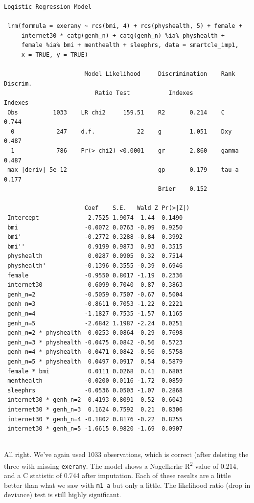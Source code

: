 \documentclass[]{book}
\theoremstyle{definition}
\theoremstyle{definition}
\theoremstyle{definition}
\theoremstyle{remark}
\begin{document}
\begin{verbatim}
Logistic Regression Model
 
 lrm(formula = exerany ~ rcs(bmi, 4) + rcs(physhealth, 5) + female + 
     internet30 * catg(genh_n) + catg(genh_n) %ia% physhealth + 
     female %ia% bmi + menthealth + sleephrs, data = smartcle_imp1, 
     x = TRUE, y = TRUE)
 
                       Model Likelihood     Discrimination    Rank Discrim.    
                          Ratio Test           Indexes           Indexes       
 Obs          1033    LR chi2     159.51    R2       0.214    C       0.744    
  0            247    d.f.            22    g        1.051    Dxy     0.487    
  1            786    Pr(> chi2) <0.0001    gr       2.860    gamma   0.487    
 max |deriv| 5e-12                          gp       0.179    tau-a   0.177    
                                            Brier    0.152                     
 
                       Coef    S.E.   Wald Z Pr(>|Z|)
 Intercept              2.7525 1.9074  1.44  0.1490  
 bmi                   -0.0072 0.0763 -0.09  0.9250  
 bmi'                  -0.2772 0.3288 -0.84  0.3992  
 bmi''                  0.9199 0.9873  0.93  0.3515  
 physhealth             0.0287 0.0905  0.32  0.7514  
 physhealth'           -0.1396 0.3555 -0.39  0.6946  
 female                -0.9550 0.8017 -1.19  0.2336  
 internet30             0.6099 0.7040  0.87  0.3863  
 genh_n=2              -0.5059 0.7507 -0.67  0.5004  
 genh_n=3              -0.8611 0.7053 -1.22  0.2221  
 genh_n=4              -1.1827 0.7535 -1.57  0.1165  
 genh_n=5              -2.6842 1.1987 -2.24  0.0251  
 genh_n=2 * physhealth -0.0253 0.0864 -0.29  0.7698  
 genh_n=3 * physhealth -0.0475 0.0842 -0.56  0.5723  
 genh_n=4 * physhealth -0.0471 0.0842 -0.56  0.5758  
 genh_n=5 * physhealth  0.0497 0.0917  0.54  0.5879  
 female * bmi           0.0111 0.0268  0.41  0.6803  
 menthealth            -0.0200 0.0116 -1.72  0.0859  
 sleephrs              -0.0536 0.0503 -1.07  0.2868  
 internet30 * genh_n=2  0.4193 0.8091  0.52  0.6043  
 internet30 * genh_n=3  0.1624 0.7592  0.21  0.8306  
 internet30 * genh_n=4 -0.1802 0.8176 -0.22  0.8255  
 internet30 * genh_n=5 -1.6615 0.9820 -1.69  0.0907  
 
\end{verbatim}

All right. We've again used 1033 observations, which is correct (after
deleting the three with missing \texttt{exerany}. The model shows a
Nagelkerke R\textsuperscript{2} value of 0.214, and a C statistic of
0.744 after imputation. Each of these results are a little better than
what we saw with \texttt{m1\_a} but only a little. The likelihood ratio
(drop in deviance) test is still highly significant.
\end{document}
